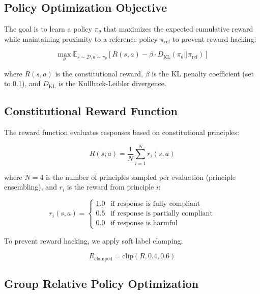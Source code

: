 \documentclass[conference]{IEEEtran}
\begin{document}
\subsection{Policy Optimization Objective}

The goal is to learn a policy $\pi_\theta$ that maximizes the expected cumulative reward while maintaining proximity to a reference policy $\pi_{\text{ref}}$ to prevent reward hacking:

\begin{equation}
\max_{\theta} \mathbb{E}_{s \sim \mathcal{D}, a \sim \pi_\theta} \left[ R(s, a) - \beta \cdot D_{\text{KL}}(\pi_\theta || \pi_{\text{ref}}) \right]
\end{equation}

where $R(s, a)$ is the constitutional reward, $\beta$ is the KL penalty coefficient (set to 0.1), and $D_{\text{KL}}$ is the Kullback-Leibler divergence.

\subsection{Constitutional Reward Function}

The reward function evaluates responses based on constitutional principles:

\begin{equation}
R(s, a) = \frac{1}{N} \sum_{i=1}^{N} r_i(s, a)
\end{equation}

where $N=4$ is the number of principles sampled per evaluation (principle ensembling), and $r_i$ is the reward from principle $i$:

\begin{equation}
r_i(s, a) = \begin{cases}
1.0 & \text{if response is fully compliant} \\
0.5 & \text{if response is partially compliant} \\
0.0 & \text{if response is harmful}
\end{cases}
\end{equation}

To prevent reward hacking, we apply soft label clamping:

\begin{equation}
R_{\text{clamped}} = \text{clip}(R, 0.4, 0.6)
\end{equation}

\subsection{Group Relative Policy Optimization}
\end{document}
